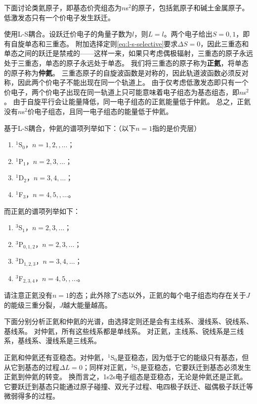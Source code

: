 \documentclass[UTF8, a4paper]{ctexart}
\newcommand*{\lsterm}[3]{$^{#1}${#2}$_{#3}$}
\begin{document}
下面讨论类氦原子，即基态价壳组态为$n$s$^2$的原子，包括氦原子和碱土金属原子。
低激发态只有一个价电子发生跃迁。

使用L-S耦合。设跃迁价电子的角量子数为$l$，则$L=l$。两个电子给出$S=0, 1$，即有自旋单态和三重态。
附加选择定则\eqref{eq:l-s-selective}要求$\Delta S=0$，因此三重态和单态之间的跃迁是禁戒的——这样一来，如果只考虑偶极辐射，三重态的原子永远处于三重态，单态的原子永远处于单态。
我们将三重态的原子称为\textbf{正氦}，将单态的原子称为\textbf{仲氦}。
三重态原子的自旋波函数是对称的，因此轨道波函数必须反对称，因此两个价电子不能出现在同一个轨道上。
由于仅考虑低激发态即只有一个价电子，两个价电子出现在同一轨道上只可能意味着电子组态为基态组态，即$n$s$^2$。
由于自旋平行会让能量降低，同一电子组态的正氦能量低于仲氦。
总之，正氦没有$n$s$^2$价电子组态，且同一电子组态的能量低于仲氦。

基于L-S耦合，仲氦的谱项列举如下：（以下$n=1$指的是价壳层）
\begin{enumerate}
    \item \lsterm{1}{S}{0}，$n=1, 2, ,\ldots$；
    \item \lsterm{1}{P}{1}，$n=2, 3, \ldots$；
    \item \lsterm{1}{D}{2}，$n=3, 4, \ldots$；
    \item \lsterm{1}{F}{3}，$n=4, 5, ,\ldots$。
\end{enumerate}
而正氦的谱项列举如下：
\begin{enumerate}
    \item \lsterm{3}{S}{1}，$n=2, 3,\ldots$；
    \item \lsterm{3}{P}{0,1,2}，$n=2, 3, \ldots$；
    \item \lsterm{3}{D}{1,2,3}，$n=3, 4, \ldots$；
    \item \lsterm{3}{F}{2,3,4}，$n=4, 5, ,\ldots$。
\end{enumerate}
请注意正氦没有$n=1$的态；此外除了S态以外，正氦的每个电子组态均存在关于$J$的能级三重分裂，$J$越大能量越高。

下面分别分析正氦和仲氦的光谱，由选择定则还是会有主线系、漫线系、锐线系、基线系。
对仲氦，所有这些线系都是单线系。
对正氦，主线系、锐线系是三线系，基线系、漫线系是三线系。

正氦和仲氦还有亚稳态。对仲氦，\lsterm{1}{S}{0}是亚稳态，因为低于它的能级只有基态，但从它到基态的过程$\Delta L = 0$；同样对正氦，\lsterm{3}{S}{1}是亚稳态，它要跃迁到基态必须发生正氦到仲氦的转变。
换而言之，1s2s电子组态是亚稳态，无论是仲氦还是正氦。它要跃迁到基态只能通过原子碰撞、双光子过程、电四极子跃迁、磁偶极子跃迁等微弱得多的过程。
\end{document}
